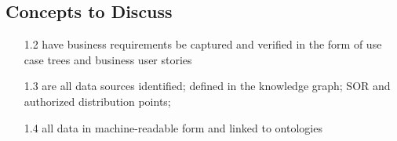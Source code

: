 \subsection*{Concepts to Discuss}

\begin{itemize}[leftmargin=.5in]
  \item [1.2] have business requirements be captured and verified in the form of use case trees and business user stories
  \item [1.3] are all data sources identified; defined in the knowledge graph; SOR and authorized distribution points;
  \item [1.4] all data in machine-readable form and linked to ontologies
\end{itemize}
